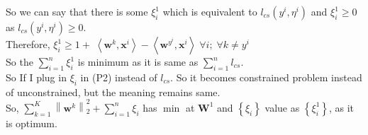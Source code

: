 \documentclass[a4paper,11pt]{article}
\begin{document}
\begin{mlsolution}
So we can say that there is some \begin{math}
\xi_{i}^{1}\end{math} which is equivalent to \begin{math}l_{cs}(y^{i}, \eta^{i})\end{math} and \begin{math} \xi_{i}^{1} \geq 0 \end{math} as \begin{math}l_{cs}(y^{i}, \eta^{i}) \geq 0 \end{math}.\\

Therefore, 
\begin{math} \xi_{i}^{1}  \geq  1 +  \;\left \langle \textbf{w}^{k}, \textbf{x}^{i} \right \rangle - \left \langle \textbf{w}^{y^{i}}, \textbf{x}^{i} \right \rangle\;\forall i; \;\forall k \neq y^{i}\end{math} \\

So the \begin{math}
\sum_{i=1}^{n} \xi_{i}^{1} 
\end{math} is minimum as it is same as \begin{math}\sum_{i=1}^{n} l_{cs}\end{math}.\\

So If I plug in \begin{math} \xi_{i} \end{math} in (P2) instead of \begin{math}
l_{cs}\end{math}. So it becomes constrained problem instead of unconstrained, but the meaning remains same.\\

So, \begin{math}
\sum_{k=1}^{K} \left \| \textbf{w}^{k} \right \|^{2}_{2} + \sum_{i=1}^{n} \xi _{i}
\end{math} has  \begin{math}
\min
\end{math} at \begin{math}\textbf{W}^{1} \end{math} and \begin{math}
\left \{\xi_{i}\right \}\end{math} value as \begin{math}\left \{ \xi_{i}^{1}\right \} \end{math}, as it is optimum.\\\\


\end{mlsolution}
\end{document}
